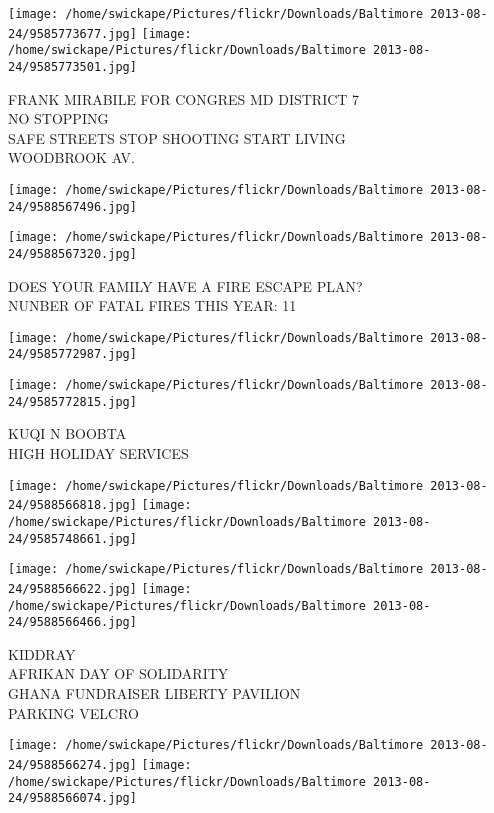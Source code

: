 \documentclass[10pt,letterpaper]{article}
\begin{document}
\texttt{[image: /home/swickape/Pictures/flickr/Downloads/Baltimore 2013-08-24/9585773677.jpg]}
\texttt{[image: /home/swickape/Pictures/flickr/Downloads/Baltimore 2013-08-24/9585773501.jpg]}

FRANK MIRABILE FOR CONGRES MD DISTRICT 7\\
NO STOPPING\\
SAFE STREETS STOP SHOOTING START LIVING\\
WOODBROOK AV.
\pagebreak

\texttt{[image: /home/swickape/Pictures/flickr/Downloads/Baltimore 2013-08-24/9588567496.jpg]}

\vspace{0.25in}
\texttt{[image: /home/swickape/Pictures/flickr/Downloads/Baltimore 2013-08-24/9588567320.jpg]}

DOES YOUR FAMILY HAVE A FIRE ESCAPE PLAN?\\
NUNBER OF FATAL FIRES THIS YEAR: 11
\pagebreak

\texttt{[image: /home/swickape/Pictures/flickr/Downloads/Baltimore 2013-08-24/9585772987.jpg]}

\vspace{0.25in}
\texttt{[image: /home/swickape/Pictures/flickr/Downloads/Baltimore 2013-08-24/9585772815.jpg]}

KUQI N BOOBTA\\
HIGH HOLIDAY SERVICES
\pagebreak

\texttt{[image: /home/swickape/Pictures/flickr/Downloads/Baltimore 2013-08-24/9588566818.jpg]}
\texttt{[image: /home/swickape/Pictures/flickr/Downloads/Baltimore 2013-08-24/9585748661.jpg]}

\texttt{[image: /home/swickape/Pictures/flickr/Downloads/Baltimore 2013-08-24/9588566622.jpg]}
\texttt{[image: /home/swickape/Pictures/flickr/Downloads/Baltimore 2013-08-24/9588566466.jpg]}

KIDDRAY\\
AFRIKAN DAY OF SOLIDARITY\\
GHANA FUNDRAISER LIBERTY PAVILION\\
PARKING VELCRO
\pagebreak

\texttt{[image: /home/swickape/Pictures/flickr/Downloads/Baltimore 2013-08-24/9588566274.jpg]}
\texttt{[image: /home/swickape/Pictures/flickr/Downloads/Baltimore 2013-08-24/9588566074.jpg]}
\end{document}
